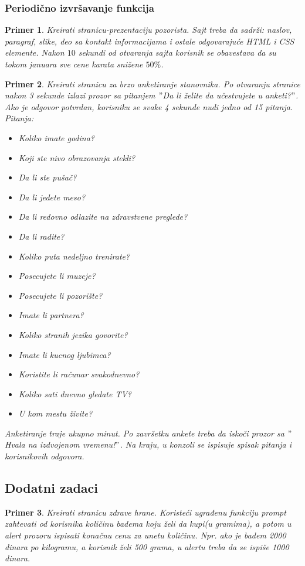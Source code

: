\documentclass[a4paper]{article}
\newtheorem{primer}{Primer}[section]
\begin{document}
\subsubsection{Periodično izvršavanje funkcija}
\begin{primer}
Kreirati stranicu-prezentaciju pozorista. Sajt treba da sadrži: naslov, paragraf, slike, deo sa kontakt informacijama i ostale odgovarajuće HTML i CSS elemente. Nakon $10$ sekundi od otvaranja sajta korisnik se obavestava da su tokom januara sve cene karata snižene $50\%$. 
\end{primer}

\begin{primer}
Kreirati stranicu za brzo anketiranje stanovnika. Po otvaranju stranice nakon 3 sekunde izlazi prozor sa pitanjem $"$Da li želite da učestvujete u anketi?$"$. Ako je odgovor potvrdan, korisniku se svake 4 sekunde nudi jedno od 15 pitanja. Pitanja:
\begin{itemize}
\item Koliko imate godina?
\item Koji ste nivo obrazovanja stekli?
\item Da li ste pušač?
\item Da li jedete meso?
\item Da li redovno odlazite na zdravstvene preglede?
\item Da li radite?
\item Koliko puta nedeljno trenirate?
\item Posecujete li muzeje?
\item Posecujete li pozorište?
\item Imate li partnera?
\item Koliko stranih jezika govorite?
\item Imate li kucnog ljubimca?
\item Koristite li računar svakodnevno?
\item Koliko sati dnevno gledate TV?
\item U kom mestu živite?
\end{itemize}  
Anketiranje traje ukupno minut. Po završetku ankete treba da iskoči prozor sa $"$Hvala na izdvojenom vremenu!$"$. Na kraju, u konzoli se ispisuje spisak pitanja i korisnikovih odgovora. 
\end{primer}

\subsection{Dodatni zadaci}
\begin{primer}
Kreirati stranicu zdrave hrane. Koristeći ugrađenu funkciju prompt zahtevati od korisnika količinu badema koju želi da kupi(u gramima), a potom u alert prozoru ispisati konačnu cenu za unetu količinu. Npr. ako je badem 2000 dinara po kilogramu, a korisnik želi 500 grama, u alertu treba da se ispiše 1000 dinara.  
\end{primer}
\end{document}
